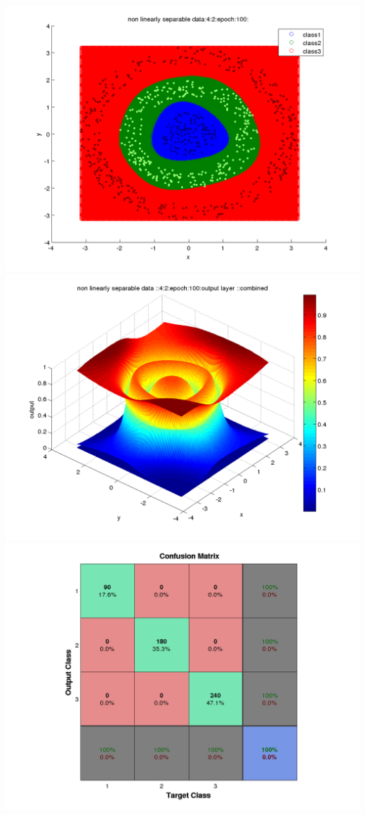 \documentclass[fleqn]{article}
\begin{document}
\includegraphics[scale=0.3]{./pics/nonlinearlyseparable/_4_2/_4_2_epoch_100_decisionBoundary}
\includegraphics[scale=0.3]{./pics/nonlinearlyseparable/_4_2/_4_2_epoch_100_output layer :_combined}
\includegraphics[scale=0.3]{./pics/nonlinearlyseparable/_4_2/_4_2_epoch_100_confusion}
\end{document}
